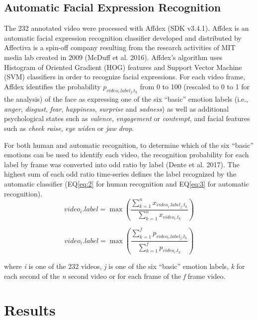 \documentclass[conference,final,]{IEEEtran}
\begin{document}
\hypertarget{automatic-facial-expression-recognition}{%
\subsection{Automatic Facial Expression
Recognition}\label{automatic-facial-expression-recognition}}

The 232 annotated video were processed with Affdex (SDK v3.4.1). Affdex
is an automatic facial expression recognition classifier developed and
distributed by Affectiva is a spin-off company resulting from the
research activities of MIT media lab created in 2009 (McDuff et al.
2016). Affdex's algorithm uses Histogram of Oriented Gradient (HOG)
features and Support Vector Machine (SVM) classifiers in order to
recognize facial expressions. For each video frame, Affdex identifies
the probability \(p_{video_{i}.label_{j}.t_{k}}\) from 0 to 100
(rescaled to 0 to 1 for the analysis) of the face as expressing one of
the six ``basic'' emotion labels (i.e., \emph{anger}, \emph{disgust},
\emph{fear}, \emph{happiness}, \emph{surprise} and \emph{sadness}) as
well as additional psychological states such as \emph{valence},
\emph{engagement} or \emph{contempt}, and facial features such as
\emph{cheek raise}, \emph{eye widen} or \emph{jaw drop}.

For both human and automatic recognition, to determine which of the six
``basic'' emotions can be used to identify each video, the recognition
probability for each label by frame was converted into odd ratio by
label (Dente et al. 2017). The highest sum of each odd ratio time-series
defines the label recognized by the automatic classifier (EQ\ref{eq:2}
for human recognition and EQ\ref{eq:3} for automatic recognition).
\begin{equation}
\label{eq:2}
video_{i}.label = \max\left(\frac{\sum_{k=1}^{n}x_{video_{i}.label_{j}.t_{k}}}{\sum_{k=1}^{n}x_{video_{i}.t_{k}}}\right)
\end{equation}

\begin{equation}
\label{eq:3}
video_{i}.label = \max\left(\frac{\sum_{k=1}^{f}p_{video_{i}.label_{j}.t_{k}}}{\sum_{k=1}^{f}p_{video_{i}.t_{k}}}\right)
\end{equation}

where \emph{i} is one of the 232 videos, \emph{j} is one of the six
``basic'' emotion labels, \emph{k} for each second of the \emph{n}
second video or for each frame of the \emph{f} frame video.

\hypertarget{results}{%
\section{Results}\label{results}}
\end{document}
